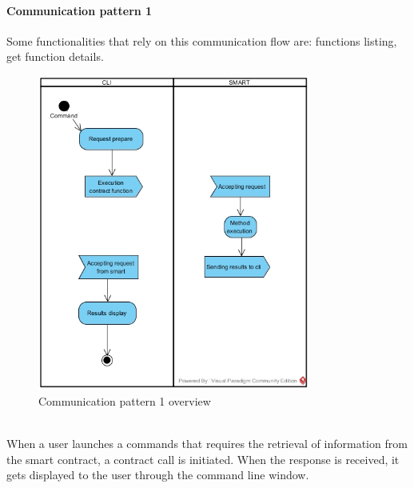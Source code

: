 \paragraph{Communication pattern 1}
Some functionalities that rely on this communication flow are: functions listing, get function details.
\begin{figure}[h]
	\centering
	\includegraphics[width=0.8\textwidth]{res/img/pattern2.jpg}
	\caption{Communication pattern 1 overview}
\end{figure}\\
\noindent When a user launches a commands that requires the retrieval of information from the smart contract, a contract call is initiated. When the response is received, it gets displayed to the user through the command line window.\newline
\newpage
